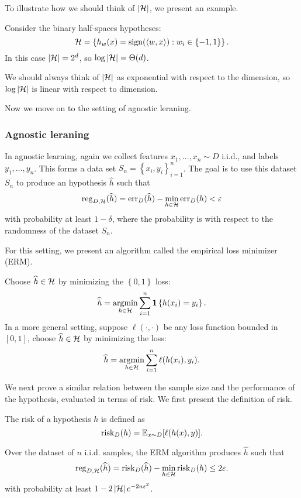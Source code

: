 \documentclass[a4paper]{article}
\begin{document}
To illustrate how we should think of $\left\lvert \mathcal{H}\right\rvert$,
we present an example.
\begin{eg}
Consider the binary half-spaces hypotheses:
\[
\mathcal{H} = \left\{ h_w(x) = \operatorname{sign}(\left\langle w, x \right\rangle) :
w_i \in \left\{ -1, 1 \right\} \right\}.
\]
In this case $\left\lvert \mathcal{H}\right\rvert = 2^d$, so $\log \left\lvert \mathcal{H}\right\rvert =
\Theta(d)$.

We should always think of $\left\lvert \mathcal{H}\right\rvert$
as exponential with respect to the dimension, so
$\log \left\lvert \mathcal{H}\right\rvert$ is linear with respect to dimension.
\end{eg}

Now we move on to the setting of agnostic leraning.

\subsubsection{Agnostic leraning}

In agnostic learning, again we collect features $x_1, \dots,
x_n \sim D$ i.i.d., and labels $y_1, \dots, y_n$. This forms a
data set $S_n = \left\{ x_i, y_i \right\}_{i=1}^n$. The
goal is to use this dataset $S_n$ to produce an hypothesis
$\hat{h}$ such that
\[
\operatorname{reg}_{D, \mathcal{H}} (\widehat{h}) =
\operatorname{err}_D (\widehat{h}) - \min_{h \in \mathcal{H}} \operatorname{err}_D (h) < \varepsilon
\]
with probability at least $1 - \delta$, where the probability
is with respect to the randomness of the dataset $S_n$.

For this setting, we present an algorithm called the empirical
loss minimizer (ERM).
\begin{algorithm}
  Choose $\widehat{h} \in \mathcal{H}$ by minimizing the $\left\{ 0,1
   \right\}$ loss:
  \[
  \widehat{h} = \operatorname*{argmin}_{h \in \mathcal{H}} \sum_{i=1}^n \mathbf{1} \left\{
    h(x_i) = y_i
   \right\}.
  \]
  In a more general setting, suppose $\ell(\cdot, \cdot)$
  be any loss function bounded in $[0, 1]$, choose
  $\widehat{h} \in \mathcal{H}$ by minimizing the loss:
  \[
  \widehat{h} = \operatorname*{argmin}_{h \in \mathcal{H}} \sum_{i=1}^n \ell(h(x_i),
  y_i).
  \]
\end{algorithm}

We next prove a similar relation between the sample
size and the performance of the hypothesis, evaluated
in terms of risk. We first present the definition
of risk.

\begin{defi}[Risk]
  The risk of a hypothesis $h$ is defined as
  \[
  \operatorname{risk}_D (h) = \mathbb{E}_{x \sim D} [ \ell(h(x), y) ].
  \]
\end{defi}

\begin{thm}
  Over the dataset of $n$ i.i.d. samples, the ERM algorithm
  produces $\hat{h}$ such that
  \[
  \operatorname{reg}_{D, \mathcal{H}} (\widehat{h})
  = \operatorname{risk}_D (\widehat{h}) - \min_{h \in \mathcal{H}}
  \operatorname{risk}_D (h)
  \leq 2 \varepsilon.
  \]
  with probability at least $1 - 2 \left\lvert \mathcal{H}\right\rvert e^{- 2
  n \varepsilon^2}$.
\end{thm}
\end{document}
